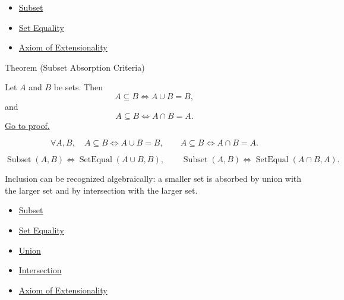 \begin{dependencies}
\begin{itemize}
  \item \hyperref[def:subset]{Subset}
  \item \hyperref[def:set-equality]{Set Equality}
  \item \hyperref[ax:extensionality]{Axiom of Extensionality}
\end{itemize}
\end{dependencies}

\begin{theorembox}{Theorem (Subset Absorption Criteria)}
\begin{theorem}\label{thm:subset-absorption-criteria}
Let $A$ and $B$ be sets. Then
\[
A\subseteq B \iff A\cup B=B,
\]
and
\[
A\subseteq B \iff A\cap B=A.
\]
\hyperref[prf:subset-absorption-criteria]{Go to proof.}
\end{theorem}
\end{theorembox}

\begin{remark*}
\[
  \forall A,B,\quad
  A\subseteq B\iff A\cup B=B,
  \qquad
  A\subseteq B\iff A\cap B=A.
\]
\end{remark*}

\begin{remark*}
\[
  \operatorname{Subset}(A,B)
  \iff
  \operatorname{SetEqual}(A\cup B,B),
  \qquad
  \operatorname{Subset}(A,B)
  \iff
  \operatorname{SetEqual}(A\cap B,A).
\]
\end{remark*}

\begin{remark*}[Interpretation]
Inclusion can be recognized algebraically: a smaller set is absorbed by union
with the larger set and by intersection with the larger set.
\end{remark*}


\begin{dependencies}
\begin{itemize}
  \item \hyperref[def:subset]{Subset}
  \item \hyperref[def:set-equality]{Set Equality}
  \item \hyperref[def:union]{Union}
  \item \hyperref[def:intersection]{Intersection}
  \item \hyperref[ax:extensionality]{Axiom of Extensionality}
\end{itemize}
\end{dependencies}

